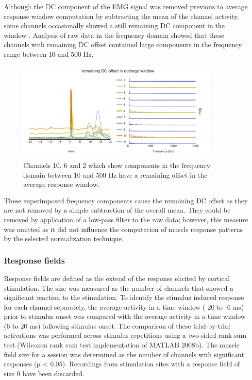 Although the DC component of the EMG signal was removed previous to average response window computation by subtracting the mean of the channel activity, some channels occasionally showed a still remaining DC component in the  window . Analysis of raw data in the frequency domain showed that these channels with remaining DC offset contained large components in the frequency range between 10 and 500 Hz.
\begin{figure}[ht]
	\centering
		\includegraphics[width=0.9\textwidth]{images/dc_offset_fourier.pdf}
	\caption{Channels 10, 6 and 2 which show components in the frequency domain between 10 and 500 Hz have a remaining offset in the average response window.}
	\label{sg:fig:images_dc_offset_fourier}
\end{figure}
These superimposed frequency components cause the remaining DC offset as they are not removed by a simple subtraction of the overall mean. They could be removed by application of a low-pass filter to the raw data; however, this measure was omitted as it did not influence the computation of muscle response patterns by the selected normalization technique.



\subsubsection{Response fields} %
\label{sg:subs:response_fields}

Response fields are defined as the extend of the response elicited by cortical stimulation. The size was measured as the number of channels that showed a significant reaction to the stimulation. To identify the stimulus induced response for each channel separately, the average activity in a time window (-20 to -6 ms) prior to stimulus onset was compared with the average activity in a time window (6 to 20 ms) following stimulus onset. The comparison of these trial-by-trial activations was performed across stimulus repetitions using a two-sided rank sum test (Wilcoxon rank sum test implementation of MATLAB 2008b). The muscle field size for a session was determined as the number of channels with significant responses (p < 0.05). Recordings from stimulation sites with a response field of size 0 have been discarded.

